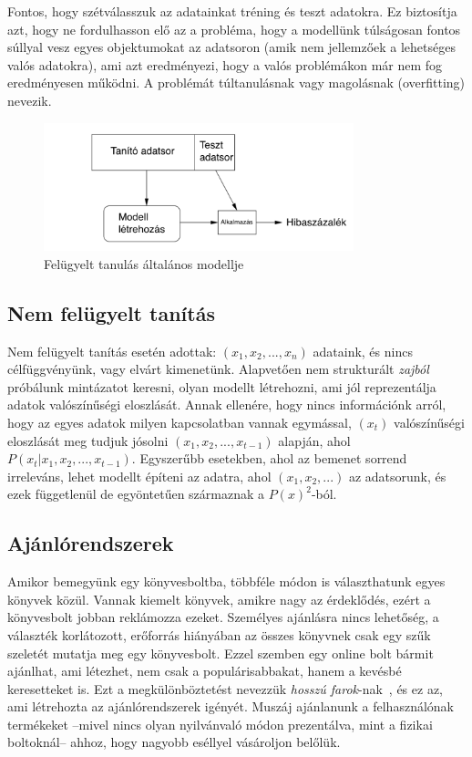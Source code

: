\documentclass[a4paper,12pt]{article}
\begin{document}
Fontos, hogy szétválasszuk az adatainkat tréning és teszt adatokra. Ez biztosítja azt, hogy ne fordulhasson elő az a probléma, hogy a modellünk túlságosan fontos súllyal vesz egyes objektumokat az adatsoron (amik nem jellemzőek a lehetséges valós adatokra), ami azt eredményezi, hogy a valós problémákon már nem fog eredményesen működni. A problémát túltanulásnak vagy magolásnak (overfitting) nevezik.~\cite[444 o.]{overfit}



\begin{figure}[ht!]
\centering
\includegraphics[width=90mm]{img/ml.png}
\caption{Felügyelt tanulás általános modellje \cite[444 o.]{overfit} \label{ml}}
\end{figure}

\subsection{Nem felügyelt tanítás}
Nem felügyelt tanítás esetén adottak: $(x_1, x_2, ..., x_n)$ adataink, és nincs célfüggvényünk, vagy elvárt kimenetünk. Alapvetően nem strukturált \textsl{zajból} próbálunk mintázatot keresni, olyan modellt létrehozni, ami jól reprezentálja adatok valószínűségi eloszlását. Annak ellenére, hogy nincs információnk arról, hogy az egyes adatok milyen kapcsolatban vannak egymással, $(x_t)$ valószínűségi eloszlását meg tudjuk jósolni  $(x_1,x_2, ..., x_{t-1})$ alapján, ahol $P(x_t|x_1,x_2, ..., x_{t-1})$.
Egyszerűbb esetekben, ahol az bemenet sorrend irreleváns, lehet modellt építeni az adatra, ahol $(x_1, x_2, ...)$ az adatsorunk, és ezek függetlenül de egyöntetűen származnak a $P(x)^2$-ból.\cite{unsupervised}

\subsection{Ajánlórendszerek}
Amikor bemegyünk egy könyvesboltba, többféle módon is választhatunk egyes könyvek közül. Vannak kiemelt könyvek, amikre nagy az érdeklődés, ezért a könyvesbolt jobban reklámozza ezeket. Személyes ajánlásra nincs lehetőség, a választék korlátozott, erőforrás hiányában az összes könyvnek csak egy szűk szeletét mutatja meg egy könyvesbolt. Ezzel szemben egy online bolt bármit ajánlhat, ami létezhet, nem csak a populárisabbakat, hanem a kevésbé keresetteket is. Ezt a megkülönböztetést nevezzük \textsl{hosszú farok}-nak~\cite{longtail}, és ez az, ami létrehozta az ajánlórendszerek igényét. Muszáj ajánlanunk a felhasználónak termékeket --mivel nincs olyan nyilvánvaló módon prezentálva, mint a fizikai boltoknál-- ahhoz, hogy nagyobb eséllyel vásároljon belőlük. \newline
\end{document}
